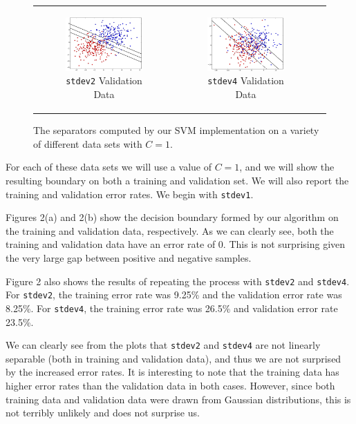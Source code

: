 \documentclass{sigchi}
\begin{document}
\begin{figure}[!ht]
\begin{tabular}{c c c}
\begin{subfigure}[b]{2.25in}
	\includegraphics[width=2.25in]{plots/1-3/casey/stdev2c1val.png}
	\caption{\texttt{stdev2} Validation Data}
\end{subfigure} &

\begin{subfigure}[b]{2.25in}
	\includegraphics[width=2.25in]{plots/1-3/casey/stdev4c1val.png}
	\caption{\texttt{stdev4} Validation Data}
\end{subfigure} \\
\end{tabular}
\caption{The separators computed by our SVM implementation on a variety of different data sets with $C = 1$.}
\end{figure}

For each of these data sets we will use a value of $C = 1$, and we will show the resulting boundary on both a training and validation set. We will also report the training and validation error rates. We begin with \texttt{stdev1}.

Figures 2(a) and 2(b) show the decision boundary formed by our algorithm on the training and validation data, respectively. As we can clearly see, both the training and validation data have an error rate of 0. This is not surprising given the very large gap between positive and negative samples.

Figure 2 also shows the results of repeating the process with \texttt{stdev2} and \texttt{stdev4}. For \texttt{stdev2}, the training error rate was 9.25\% and the validation error rate was 8.25\%. For \texttt{stdev4}, the training error rate was 26.5\% and validation error rate 23.5\%.

We can clearly see from the plots that \texttt{stdev2} and \texttt{stdev4} are not linearly separable (both in training and validation data), and thus we are not surprised by the increased error rates. It is interesting to note that the training data has higher error rates than the validation data in both cases. However, since both training data and validation data were drawn from Gaussian distributions, this is not terribly unlikely and does not surprise us.
\end{document}
